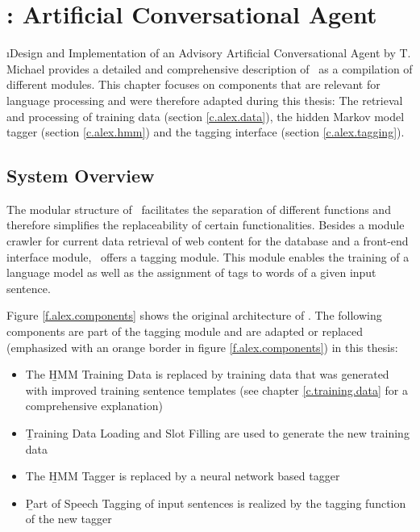 \chapter{\Alex: Artificial Conversational Agent}\label{c.alex}
\i{Design and Implementation of an Advisory Artificial Conversational Agent} by T. Michael \cite{michael2016} provides a detailed and comprehensive description of \Alex\ as a compilation of different modules. This chapter focuses on components that are relevant for language processing and were therefore adapted during this thesis: The retrieval and processing of training data (section \ref{c.alex.data}), the hidden Markov model tagger (section \ref{c.alex.hmm}) and the tagging interface (section \ref{c.alex.tagging}).

\section{System Overview}\label{c.alex.overview}
The modular structure of \Alex\ facilitates the separation of different functions and therefore simplifies the replaceability of certain functionalities. Besides a module crawler for current data retrieval of web content for the database and a front-end interface module, \Alex\ offers a tagging module. This module enables the training of a language model as well as the assignment of tags to words of a given input sentence.

Figure \ref{f.alex.components} shows the original architecture of \Alex. The following components are part of the tagging module and are adapted or replaced (emphasized with an orange border in figure \ref{f.alex.components}) in this thesis:

\begin{itemize}
	\item The \b{HMM Training Data} is replaced by training data that was generated with improved training sentence templates (see chapter \ref{c.training.data} for a comprehensive explanation)
	\item \b{Training Data Loading and Slot Filling} are used to generate the new training data
	\item The \b{HMM Tagger} is replaced by a neural network based tagger
	\item \b{Part of Speech Tagging} of input sentences is realized by the tagging function of the new tagger
\end{itemize}

